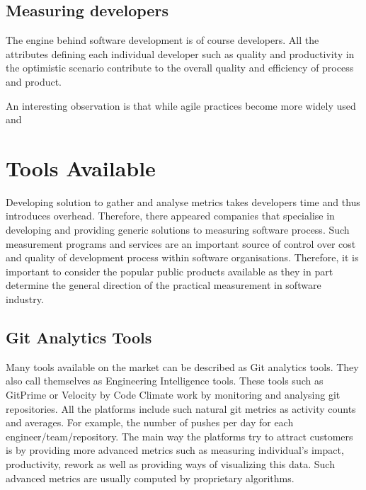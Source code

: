 \documentclass[11pt]{article}
\begin{document}
\subsection{Measuring developers}
The engine behind software development is of course developers. All the attributes defining each individual developer such as quality and productivity in the optimistic scenario contribute to the overall quality and efficiency of process and product.

An interesting observation is that while agile practices become more widely used and 

\section{Tools Available}
\label{sec:Platforms}
Developing solution to gather and analyse metrics takes developers time and thus introduces overhead. Therefore, there appeared companies that specialise in developing and providing generic solutions to measuring software process. Such measurement programs and services are an important source of control over cost and quality of development process within software organisations.\cite{ieee-measurement-programs} Therefore, it is important to consider the popular public products available as they in part determine the general direction of the practical measurement in software industry.

\subsection{Git Analytics Tools}
\par
Many tools available on the market can be described as Git analytics tools. They also call themselves as Engineering Intelligence tools. 
These tools such as GitPrime or Velocity by Code Climate work by monitoring and analysing git repositories. All the platforms include such natural git metrics as activity counts and averages. For example, the number of pushes per day for each engineer/team/repository. The main way the platforms try to attract customers is by providing more advanced metrics such as measuring individual's impact, productivity, rework as well as providing ways of visualizing this data. Such advanced metrics are usually computed by proprietary algorithms.
\end{document}
